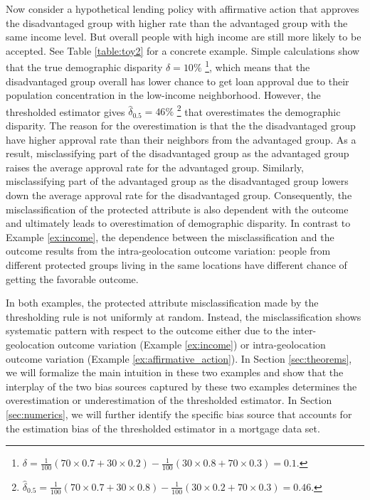 \begin{example}
\label{ex:affirmative_action}
  Now consider a hypothetical lending policy with affirmative action that approves the disadvantaged group with higher rate than the advantaged group with the same income level. But overall people with high income are still more likely to be accepted. See Table \ref{table:toy2} for a concrete example. Simple calculations show that the true demographic disparity $\delta = 10\%$ \footnote{$\delta = \frac{1}{100}(70\times 0.7 + 30 \times 0.2) - \frac{1}{100}(30\times 0.8 + 70 \times 0.3) = 0.1$.}, which means that the disadvantaged group overall has lower chance to get loan approval due to their population concentration in the low-income neighborhood. However, the thresholded estimator gives  $\hat{\delta}_{0.5} = 46\%$ \footnote{$\hat{\delta}_{0.5} = \frac{1}{100}(70\times 0.7 + 30 \times 0.8) - \frac{1}{100}(30\times 0.2 + 70 \times 0.3) = 0.46$.} that overestimates the demographic disparity. The reason for the overestimation is that the the disadvantaged group have higher approval rate than their neighbors from the advantaged group. As a result, misclassifying part of the disadvantaged group as the advantaged group raises the average approval rate for the advantaged group. Similarly, misclassifying part of the advantaged group as the disadvantaged group lowers down the average approval rate for the disadvantaged group. Consequently, the misclassification of the protected attribute is also dependent with the outcome and ultimately leads to overestimation of demographic disparity. In contrast to Example \ref{ex:income}, the dependence between the misclassification and the outcome results from the intra-geolocation outcome variation: people from different protected groups living in the same locations have different chance of getting the favorable outcome.
\end{example}

In both examples, the protected attribute misclassification made by the thresholding rule is not uniformly at random. Instead, the misclassification shows systematic pattern with respect to the outcome either due to the inter-geolocation outcome variation (Example \ref{ex:income}) or intra-geolocation outcome variation (Example \ref{ex:affirmative_action}). In Section \ref{sec:theorems}, we will formalize the main intuition in these two examples and show that the interplay of the two bias sources captured by these two examples determines the overestimation or underestimation of the thresholded estimator. In Section \ref{sec:numerics}, we will further identify the specific bias source that accounts for the estimation bias of the thresholded estimator in a mortgage data set.
